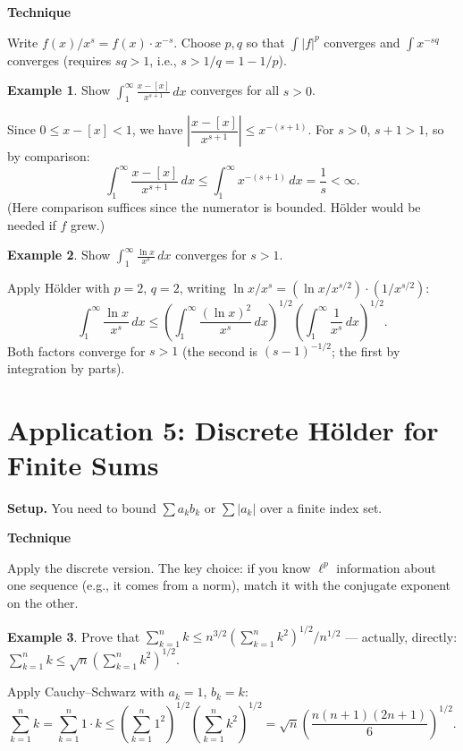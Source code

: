 \documentclass[11pt]{article}
\theoremstyle{myplain}
\theoremstyle{definition}
\newtheorem{example}{Example}
\theoremstyle{remark}
\newenvironment{technique}{%
  \par\smallskip
  \noindent\colorbox{Apricot}{\textbf{Technique}}\enspace\ignorespaces
}{\par\smallskip}
\begin{document}
\begin{technique}
Write $f(x)/x^s = f(x) \cdot x^{-s}$. Choose $p,q$ so that $\int |f|^p$ converges and $\int x^{-sq}$ converges (requires $sq > 1$, i.e., $s > 1/q = 1 - 1/p$).
\end{technique}

\begin{example}
Show $\displaystyle\int_1^\infty \frac{x-[x]}{x^{s+1}}\,dx$ converges for all $s > 0$.

Since $0 \leq x - [x] < 1$, we have $\left|\dfrac{x-[x]}{x^{s+1}}\right| \leq x^{-(s+1)}$. For $s > 0$, $s + 1 > 1$, so by comparison:
\[
  \int_1^\infty \frac{x-[x]}{x^{s+1}}\,dx \leq \int_1^\infty x^{-(s+1)}\,dx = \frac{1}{s} < \infty.
\]
(Here comparison suffices since the numerator is bounded. H\"{o}lder would be needed if $f$ grew.)
\end{example}

\begin{example}
Show $\displaystyle\int_1^\infty \frac{\ln x}{x^s}\,dx$ converges for $s > 1$.

Apply H\"{o}lder with $p = 2$, $q = 2$, writing $\ln x / x^s = (\ln x / x^{s/2}) \cdot (1/x^{s/2})$:
\[
  \int_1^\infty \frac{\ln x}{x^s}\,dx \leq \left(\int_1^\infty \frac{(\ln x)^2}{x^s}\,dx\right)^{1/2}\!\left(\int_1^\infty \frac{1}{x^s}\,dx\right)^{1/2}.
\]
Both factors converge for $s > 1$ (the second is $(s-1)^{-1/2}$; the first by integration by parts).
\end{example}

\section{Application 5: Discrete H\"{o}lder for Finite Sums}

\textbf{Setup.} You need to bound $\sum a_k b_k$ or $\sum |a_k|$ over a finite index set.

\begin{technique}
Apply the discrete version. The key choice: if you know $\ell^p$ information about one sequence (e.g., it comes from a norm), match it with the conjugate exponent on the other.
\end{technique}

\begin{example}
Prove that $\displaystyle\sum_{k=1}^n k \leq n^{3/2}\left(\sum_{k=1}^n k^2\right)^{1/2} / n^{1/2}$ --- actually, directly: $\sum_{k=1}^n k \leq \sqrt{n}\left(\sum_{k=1}^n k^2\right)^{1/2}$.

Apply Cauchy--Schwarz with $a_k = 1$, $b_k = k$:
\[
  \sum_{k=1}^n k = \sum_{k=1}^n 1 \cdot k \leq \left(\sum_{k=1}^n 1^2\right)^{1/2}\!\left(\sum_{k=1}^n k^2\right)^{1/2} = \sqrt{n}\left(\frac{n(n+1)(2n+1)}{6}\right)^{1/2}.
\]
\end{example}
\end{document}
